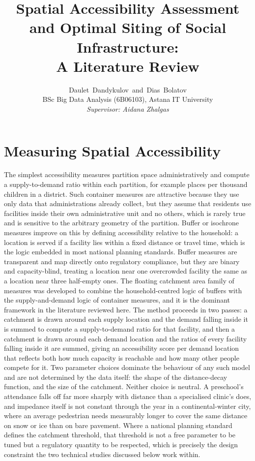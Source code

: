 \documentclass[journal]{IEEEtran}
\title{Spatial Accessibility Assessment and Optimal Siting of Social Infrastructure:\\ A Literature Review}
\author{Daulet~Dandykulov~and~Dias~Bolatov\\
        BSc Big Data Analysis (6B06103), Astana IT University\\
        \textit{Supervisor: Aidana Zhalgas}}
\begin{document}
\maketitle

\section{Measuring Spatial Accessibility}
\label{sec:measure}

The simplest accessibility measures partition space administratively and compute a supply-to-demand ratio within each partition, for example places per thousand children in a district. Such container measures are attractive because they use only data that administrations already collect, but they assume that residents use facilities inside their own administrative unit and no others, which is rarely true and is sensitive to the arbitrary geometry of the partition. Buffer or isochrone measures improve on this by defining accessibility relative to the household: a location is served if a facility lies within a fixed distance or travel time, which is the logic embedded in most national planning standards. Buffer measures are transparent and map directly onto regulatory compliance, but they are binary and capacity-blind, treating a location near one overcrowded facility the same as a location near three half-empty ones. The floating catchment area family of measures was developed to combine the household-centred logic of buffers with the supply-and-demand logic of container measures, and it is the dominant framework in the literature reviewed here. The method proceeds in two passes: a catchment is drawn around each supply location and the demand falling inside it is summed to compute a supply-to-demand ratio for that facility, and then a catchment is drawn around each demand location and the ratios of every facility falling inside it are summed, giving an accessibility score per demand location that reflects both how much capacity is reachable and how many other people compete for it. Two parameter choices dominate the behaviour of any such model and are not determined by the data itself: the shape of the distance-decay function, and the size of the catchment. Neither choice is neutral. A preschool's attendance falls off far more sharply with distance than a specialised clinic's does, and impedance itself is not constant through the year in a continental-winter city, where an average pedestrian needs measurably longer to cover the same distance on snow or ice than on bare pavement. Where a national planning standard defines the catchment threshold, that threshold is not a free parameter to be tuned but a regulatory quantity to be respected, which is precisely the design constraint the two technical studies discussed below work within.
\end{document}
